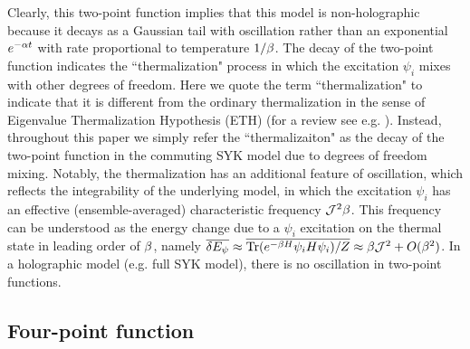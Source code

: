 \documentclass[11pt]{article}
\renewcommand{\>}{\rangle}
\newcommand{\<}{\langle}
\begin{document}
Clearly, this two-point function implies that this model is non-holographic
because it decays as a Gaussian tail with oscillation rather than
an exponential $e^{-\alpha t}$ with rate proportional to temperature
$1/\beta$. The decay of the two-point function indicates the ``thermalization" process in which the excitation $\psi_i$ mixes with other degrees of freedom. Here we quote the term ``thermalization" to indicate that it is different from the ordinary thermalization in the sense of Eigenvalue Thermalization Hypothesis (ETH) (for a review see e.g. \cite{deutsch2018eigenstate}). Instead, throughout this paper we simply refer the ``thermalizaiton" as the decay of the two-point function in the commuting SYK model due to degrees of freedom mixing. Notably, the thermalization has an additional feature of oscillation, which reflects the integrability of the underlying model, in which the excitation $\psi_i$ has an effective (ensemble-averaged) characteristic frequency $\mathcal{J}^2\beta$. This frequency can be understood as the energy change due to a $\psi_i$ excitation on the thermal state in leading order of $\beta$, namely $\overline{\delta E_\psi}\approx\overline{\text{Tr} (e^{-\beta H}\psi_i H \psi_i)/Z}\approx \beta \mathcal{J}^2+O(\beta^2)$. In a holographic model (e.g. full SYK model), there is no oscillation in two-point functions.

\subsection{Four-point function}
\end{document}
